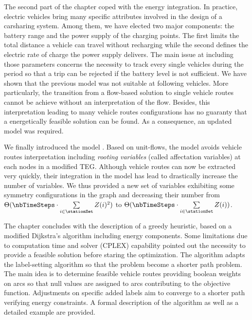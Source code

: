 \begin{bibunit}[ieeetr]
\medskip
The second part of the chapter coped with the energy integration.
In practice, electric vehicles bring many specific attributes involved in the design of a carsharing system.
Among them, we have elected two major components: the battery range and the power supply of the charging points.
The first limits the total distance a vehicle can travel without recharging while the second defines the electric rate of charge the power supply delivers.
The main issue at including those parameters concerns the necessity to track every single vehicles during the period so that a trip can be rejected if the battery level is not sufficient.
We have shown that the previous model {\SLP} was not suitable at following vehicles.
More particularly, the transition from a flow-based solution to single vehicle routes cannot be achieve without an interpretation of the flow.
Besides, this interpretation leading to many vehicle routes configurations has no guaranty that a energetically feasible solution can be found.
As a consequence, an updated model was required.

\medskip
We finally introduced the model {\ENERGY}.
Based on unit-flows, the model avoids vehicle routes interpretation including \emph{rooting variables} (called affectation variables) at each nodes in a modified TEG.
Although vehicle routes can now be extracted very quickly, their integration in the model has lead to drastically increase the number of variables.
We thus provided a new set of variables exhibiting some symmetry configurations in the graph and decreasing their number from $\Theta (\nbTimeSteps \cdot \sum\limits_{i \in \stationSet} Z(i)^2)$ to $\Theta (\nbTimeSteps \cdot \sum\limits_{i \in \stationSet} Z(i))$.

\medskip
The chapter concludes with the description of a greedy heuristic, based on a modified Dijkstra's algorithm including energy components.
Some limitations due to computation time and solver (CPLEX) capability pointed out the necessity to provide a feasible solution before staring the optimization.
The algorithm adapts the label-setting algorithm so that the problem become a shorter path problem.
The main idea is to determine feasible vehicle routes providing boolean weights on arcs so that null values are assigned to arcs contributing to the objective function.
Adjustments on specific added labels aim to converge to a shorter path verifying energy constraints.
A formal description of the algorithm as well as a detailed example are provided.



\end{bibunit}
